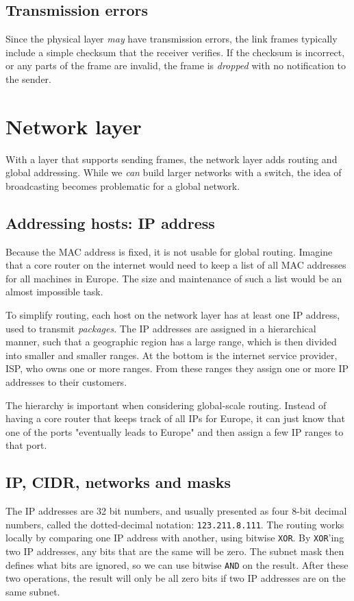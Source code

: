 \subsection{Transmission errors}
Since the physical layer \emph{may} have transmission errors, the link frames typically include a simple checksum that the receiver verifies. If the checksum is incorrect, or any parts of the frame are invalid, the frame is \emph{dropped} with no notification to the sender.

\section{Network layer}
With a layer that supports sending frames, the network layer adds routing and global addressing. While we \emph{can} build larger networks with a switch, the idea of broadcasting becomes problematic for a global network. 

\subsection{Addressing hosts: IP address}
Because the MAC address is fixed, it is not usable for global routing. Imagine that a core router on the internet would need to keep a list of all MAC addresses for all machines in Europe. The size and maintenance of such a list would be an almost impossible task.

To simplify routing, each host on the network layer has at least one IP address, used to transmit \emph{packages}. The IP addresses are assigned in a hierarchical manner, such that a geographic region has a large range, which is then divided into smaller and smaller ranges. At the bottom is the internet service provider, ISP, who owns one or more ranges. From these ranges they assign one or more IP addresses to their customers.

The hierarchy is important when considering global-scale routing. Instead of having a core router that keeps track of all IPs for Europe, it can just know that one of the ports "eventually leads to Europe" and then assign a few IP ranges to that port.

\subsection{IP, CIDR, networks and masks}
The IP addresses are 32 bit numbers, and usually presented as four 8-bit decimal numbers, called the dotted-decimal notation: \texttt{123.211.8.111}. The routing works locally by comparing one IP address with another, using bitwise \texttt{XOR}. By \texttt{XOR}'ing two IP addresses, any bits that are the same will be zero. The subnet mask then defines what bits are ignored, so we can use bitwise \texttt{AND} on the result. After these two operations, the result will only be all zero bits if two IP addresses are on the same subnet.

